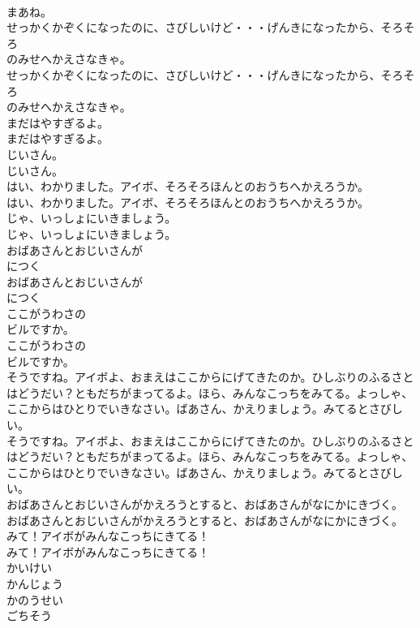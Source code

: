 \documentclass[8pt]{extreport}
\begin{document}
\begin{CJK}{UTF8}{min}
\\	まあね。 
\\	せっかくかぞくになったのに、さびしいけど・・・げんきになったから、そろそろ
\\	のみせへかえさなきゃ。	
\\	せっかくかぞくになったのに、さびしいけど・・・げんきになったから、そろそろ
\\	のみせへかえさなきゃ。 
\\	まだはやすぎるよ。	
\\	まだはやすぎるよ。 
\\	じいさん。	
\\	じいさん。 
\\	はい、わかりました。アイボ、そろそろほんとのおうちへかえろうか。	
\\	はい、わかりました。アイボ、そろそろほんとのおうちへかえろうか。 
\\	じゃ、いっしょにいきましょう。	
\\	じゃ、いっしょにいきましょう。 
\\	おばあさんとおじいさんが
\\	につく
\\	おばあさんとおじいさんが
\\	につく
\\	ここがうわさの
\\	ビルですか。	
\\	ここがうわさの
\\	ビルですか。 
\\	そうですね。アイボよ、おまえはここからにげてきたのか。ひしぶりのふるさとはどうだい？ともだちがまってるよ。ほら、みんなこっちをみてる。よっしゃ、ここからはひとりでいきなさい。ばあさん、かえりましょう。みてるとさびしい。	
\\	そうですね。アイボよ、おまえはここからにげてきたのか。ひしぶりのふるさとはどうだい？ともだちがまってるよ。ほら、みんなこっちをみてる。よっしゃ、ここからはひとりでいきなさい。ばあさん、かえりましょう。みてるとさびしい。 
\\	おばあさんとおじいさんがかえろうとすると、おばあさんがなにかにきづく。
\\	おばあさんとおじいさんがかえろうとすると、おばあさんがなにかにきづく。
\\	みて！アイボがみんなこっちにきてる！	
\\	みて！アイボがみんなこっちにきてる！ 
\\	かいけい
\\	かんじょう
\\	かのうせい
\\	ごちそう

\end{CJK}
\end{document}
